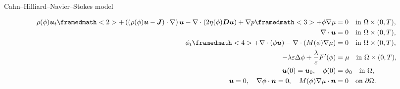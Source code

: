 \begin{frame}{Cahn--Hilliard--Navier--Stokes model}
  \footnotesize
  \vspace*{-0.2cm}
  \begin{block}{}
  \vspace*{-0.5cm}
  \begin{subequations}
      \begin{align*}
          \rho(\phi)\uu_t\framedmath<2>{+\left((\rho(\phi)\uu - \JJ
          )\cdot\nabla\right)\uu}-\nabla\cdot(2\eta(\phi)\DD\uu)+\nabla p 
          \framedmath<3>{+ \phi \nabla \mu}&=0\quad\text{in }\Omega\times(0,T),\\
          \nabla\cdot\uu&=0\quad\text{in }\Omega\times(0,T),\\
          \phi_t\framedmath<4>{+\nabla\cdot(\phi\uu)}-\nabla\cdot(M(\phi)\nabla \mu)&=0\quad\text{in }\Omega\times(0,T),\\
          -\lambda\varepsilon\Delta\phi+\frac{\lambda}{\varepsilon}F'(\phi)&=\mu\quad\text{in }\Omega\times(0,T),\\
          \uu(0)=\uu_0,\quad\phi(0)&=\phi_0\quad\text{in }\Omega,\\
          \uu=0,\quad\nabla\phi\cdot\nn=0,\quad M(\phi)\nabla\mu\cdot\nn&=0\quad\text{on }\partial\Omega.
      \end{align*}
  \end{subequations}
  \end{block}
  \begin{itemize}

\end{itemize}
\end{frame}
